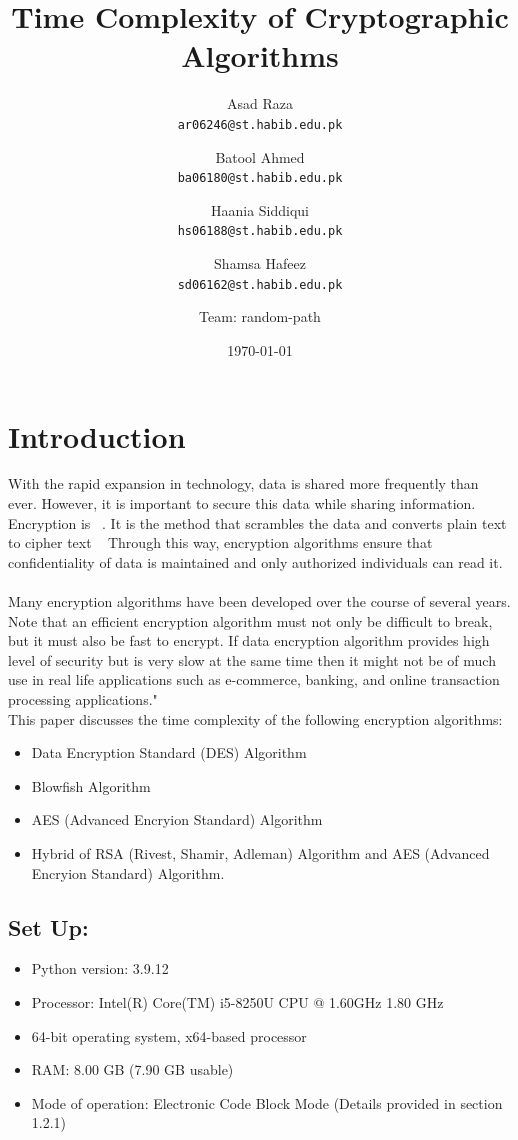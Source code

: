 \documentclass[a4paper]{report} %
\title{Time Complexity of Cryptographic Algorithms}
\author{  Asad Raza\\
  \texttt{ar06246@st.habib.edu.pk}
  \and
  Batool Ahmed\\
  \texttt{ba06180@st.habib.edu.pk}
  \and 
  Haania Siddiqui\\
  \texttt{hs06188@st.habib.edu.pk}
  \and
  Shamsa Hafeez\\
  \texttt{sd06162@st.habib.edu.pk}
  \and 
  Team: random-path \\}
\date{\today}
\begin{document}
\maketitle

\chapter{Introduction} 

With the rapid expansion in technology, data is shared more frequently than ever. However, it is important to secure this data while sharing information. Encryption is 
~\cite{cloudflare}. It is the method that scrambles the data and converts plain text to cipher text ~\cite{unknown} Through this way, encryption algorithms ensure that confidentiality of data is maintained and only authorized individuals can read it. ~\cite{unknown}\\

Many encryption algorithms have been developed over the course of several years. Note that an efficient encryption algorithm must not only be difficult to break, but it must also be fast to encrypt. If data encryption algorithm provides high level of security but is very slow at the same time then it might not be of much use in real life applications such as e-commerce, banking, and online transaction processing applications." ~\cite{1598556}\\

This paper discusses the time complexity of the following encryption algorithms: \\ 
\begin{itemize}
    \item Data Encryption Standard (DES) Algorithm 
    \item Blowfish Algorithm 
    \item AES (Advanced Encryion Standard) Algorithm
    \item Hybrid of RSA (Rivest, Shamir, Adleman) Algorithm and AES (Advanced Encryion Standard) Algorithm. 
\end{itemize}

\section{Set Up:}
\begin{itemize}
    \item Python version: 3.9.12
    \item Processor: Intel(R) Core(TM) i5-8250U CPU @ 1.60GHz   1.80 GHz
    \item 64-bit operating system, x64-based processor
    \item RAM: 8.00 GB (7.90 GB usable)
    \item Mode of operation: Electronic Code Block Mode (Details provided in section 1.2.1)
\end{itemize}
\end{document}
